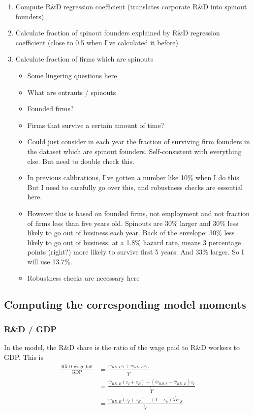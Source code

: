 \documentclass[11pt,english]{article}
\theoremstyle{remark}
\begin{document}
\footnotesize
\begin{enumerate}
	\item Compute R\&D regression coefficient (translates corporate R\&D into spinout founders)
	\item Calculate fraction of spinout founders explained by R\&D regression coefficient (close to 0.5 when I've calculated it before)
	\item Calculate fraction of firms which are spinouts
	\begin{itemize}
		\item Some lingering questions here
		\item What are entrants / spinouts
		\item Founded firms?
		\item Firms that survive a certain amount of time?
		\item Could just consider in each year the fraction of surviving firm founders in the dataset which are spinout founders. Self-consistent with everything else. But need to double check this.
		\item In previous calibrations, I've gotten a number like 10\% when I do this. But I need to carefully go over this, and robustness checks are essential here.
		\item However this is based on founded firms, not employment and not fraction of firms less than five years old. Spinouts are 30\% larger and 30\% less likely to go out of business each year. Back of the envelope: 30\% less likely to go out of business, at a 1.8\% hazard rate, means 3 percentage points (right?) more likely to survive first 5 years. And 33\% larger. So I will use 13.7\%.
		\item Robustness checks are necessary here
	\end{itemize}
\end{enumerate}
\normalsize

\subsection{Computing the corresponding model moments}

\subsubsection{R\&D / GDP} 

In the model, the R\&D share is the ratio of the wage paid to R\&D workers to GDP. This is
\begin{align*}
\frac{\textrm{R\&D wage bill}}{\textrm{GDP}} &= \frac{\overline{w}_{RD,I} z_I + \overline{w}_{RD,E} z_E}{\tilde{Y}} \\ 
&= \frac{\overline{w}_{RD,E} (z_I + z_E) + (\overline{w}_{RD,I} - \overline{w}_{RD,E})z_I}{\tilde{Y}} \\
&= \frac{\overline{w}_{RD,E} (z_I + z_E) - (1-\kappa_e) \lambda \tilde{V} \tau_S}{\tilde{Y}}
\end{align*}
\end{document}
